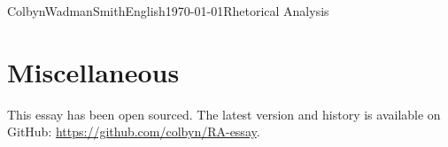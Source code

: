 \documentclass[american, 12pt]{article}
\begin{document}
\begin{mla}{Colbyn}{Wadman}{Smith}{English}{\today}{Rhetorical Analysis}








\section*{Miscellaneous}

\begin{center}
This essay has been open sourced. The latest version and history is available on GitHub:
\url{https://github.com/colbyn/RA-essay}.
\end{center}





\end{mla}
\end{document}
